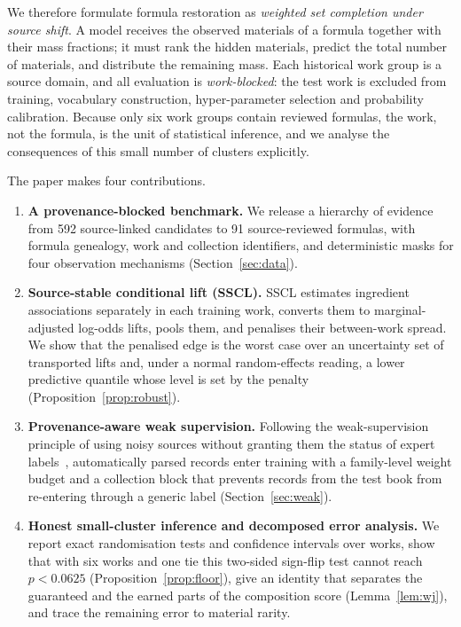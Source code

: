 \documentclass[applsci,article,submit,oneauthor]{Definitions/mdpi}
\begin{document}
We therefore formulate formula restoration as \emph{weighted set completion under source shift}. A model receives the observed materials of a formula together with their mass fractions; it must rank the hidden materials, predict the total number of materials, and distribute the remaining mass. Each historical work group is a source domain, and all evaluation is \emph{work-blocked}: the test work is excluded from training, vocabulary construction, hyper-parameter selection and probability calibration. Because only six work groups contain reviewed formulas, the work, not the formula, is the unit of statistical inference, and we analyse the consequences of this small number of clusters explicitly.

The paper makes four contributions.
\begin{enumerate}
\item \textbf{A provenance-blocked benchmark.} We release a hierarchy of evidence from 592 source-linked candidates to 91 source-reviewed formulas, with formula genealogy, work and collection identifiers, and deterministic masks for four observation mechanisms (Section~\ref{sec:data}).
\item \textbf{Source-stable conditional lift (SSCL).} SSCL estimates ingredient associations separately in each training work, converts them to marginal-adjusted log-odds lifts, pools them, and penalises their between-work spread. We show that the penalised edge is the worst case over an uncertainty set of transported lifts and, under a normal random-effects reading, a lower predictive quantile whose level is set by the penalty (Proposition~\ref{prop:robust}).
\item \textbf{Provenance-aware weak supervision.} Following the weak-supervision principle of using noisy sources without granting them the status of expert labels~\cite{ratner2017}, automatically parsed records enter training with a family-level weight budget and a collection block that prevents records from the test book from re-entering through a generic label (Section~\ref{sec:weak}).
\item \textbf{Honest small-cluster inference and decomposed error analysis.} We report exact randomisation tests and confidence intervals over works, show that with six works and one tie this two-sided sign-flip test cannot reach $p<0.0625$ (Proposition~\ref{prop:floor}), give an identity that separates the guaranteed and the earned parts of the composition score (Lemma~\ref{lem:wj}), and trace the remaining error to material rarity.
\end{enumerate}
\end{document}
